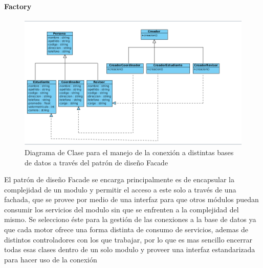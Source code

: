 \paragraph{Factory}
\begin{figure}[H]
	\centering
	\includegraphics[width=1\linewidth]{parte2/imgs/Patrones/FactoryMethod}
	\caption[Diagrama de clases del patrón Facade]{Diagrama de Clase para el manejo de la conexión a distintas bases de datos a través del patrón de diseño Facade}
	\label{fig:facade}
\end{figure}

El patrón de diseño Facade se encarga principalmente es de encapsular la complejidad de un modulo y permitir el acceso a este solo a través de una fachada, que se provee por medio de una interfaz para que otros módulos puedan consumir los servicios del modulo sin que se enfrenten a la complejidad del mismo. Se selecciono éste para la gestión de las conexiones a la base de datos ya que cada motor ofrece una forma distinta de consumo de servicios, ademas de distintos controladores con los que trabajar, por lo que es mas sencillo encerrar todas esas clases dentro de un solo modulo y proveer una interfaz estandarizada para hacer uso de la conexión

